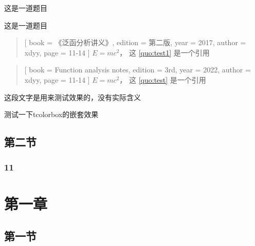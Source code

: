 \documentclass{xdyy-notes}
\begin{document}
\begin{exercise}
  这是一道题目
\end{exercise}

\begin{exercise}
  这是一道题目
\end{exercise}


\begin{quotation}[
  book    = {《泛函分析讲义》},      %
  edition = {第二版},                %
  year    = {2017},                  %
  author  = {xdyy},                  %
  page    = {11-14}                  %
]\label{quo:test1}
  $E = m c^2$， 这 \ref{quo:test1} 是一个引用
\end{quotation}


\begin{quotation}[
  book = {Function analysis notes},
  edition = {3rd},
  year = {2022},
  author = {xdyy},
  page = {11-14}
]\label{quo:test}
  $E = m c^2$， 这 \ref{quo:test} 是一个引用
\end{quotation}


\begin{detail}[
  book = {《泛函分析讲义》},
  author = {许全华},
  edition = {第一版},
  year = {2017},
  page = {103},
  line = {倒数第三行},
  original = {
    \zhlipsum[1-2]
  }
]
  这段文字是用来测试效果的，没有实际含义
  \begin{remark}
    测试一下tcolorbox的嵌套效果
  \end{remark}
\end{detail}





\correction[
  book = {《摸鱼讲义》},
  author = {夏康玮},
  edition = {第一版},
  year = {2022},
  page = {88},
  line = {3},
  original = {
    \zhlipsum[1]
  },
  revision = {
    \zhlipsum[2]
  },
  explanation = {
    无须多言
  }
]

\section{第二节}


\zhlipsum[1-6]






\subsection{11}


\zhlipsum[1-2]



\chapter{第一章}

\section{第一节}
\cite{DiophantineQueffelec}


\backmatter
\printbibliography
\end{document}

